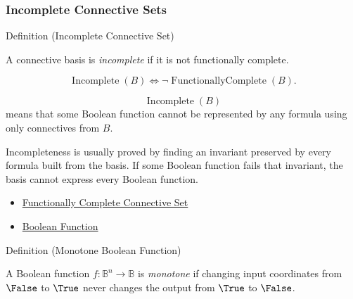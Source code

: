 \subsubsection*{Incomplete Connective Sets}

\begin{definitionbox}{Definition (Incomplete Connective Set)}
\begin{definition}
\label{def:incomplete-connective-set-propositional-logic}
A connective basis is \emph{incomplete} if it is not functionally complete.
\end{definition}
\end{definitionbox}

\begin{remark*}
\[
\operatorname{Incomplete}(B)
\Longleftrightarrow
\neg\operatorname{FunctionallyComplete}(B).
\]
\end{remark*}

\begin{remark*}
\[
  \operatorname{Incomplete}(B)
\] means that some Boolean function cannot be
represented by any formula using only connectives from \(B\).
\end{remark*}

\begin{remark*}[Interpretation]
Incompleteness is usually proved by finding an invariant preserved by every
formula built from the basis. If some Boolean function fails that invariant, the
basis cannot express every Boolean function.
\end{remark*}

\begin{dependencies}
\begin{itemize}
  \item \hyperref[def:functionally-complete-connective-set-propositional-logic]{Functionally Complete Connective Set}
  \item \hyperref[def:boolean-function-propositional-logic]{Boolean Function}
\end{itemize}
\end{dependencies}

\begin{definitionbox}{Definition (Monotone Boolean Function)}
\begin{definition}
\label{def:monotone-boolean-function-propositional-logic}
A Boolean function \(f:\mathbb{B}^n\to\mathbb{B}\) is \emph{monotone} if
changing input coordinates from \(\False\) to \(\True\) never changes the output
from \(\True\) to \(\False\).
\end{definition}
\end{definitionbox}

